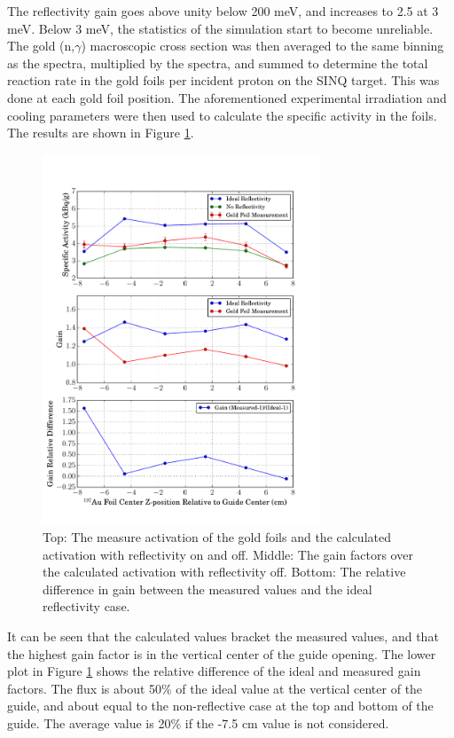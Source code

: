 \documentclass[a4paper,
              ]{jacow}
\begin{document}
The reflectivity gain goes above unity below 200 meV, and increases to 2.5 at 3 meV.  Below 3 meV, the statistics of the simulation start to become unreliable.  The gold (n,$\gamma$) macroscopic cross section was then averaged to the same binning as the spectra, multiplied by the spectra, and summed to determine the total reaction rate in the gold foils per incident proton on the SINQ target.  This was done at each gold foil position.  The aforementioned experimental irradiation and cooling parameters were then used to calculate the specific activity in the foils.  The results are shown in Figure \ref{activation}.

\begin{figure}[!htb]
   \centering
   \includegraphics*[trim = 0mm 5mm 15mm 25mm, width=83mm]{graphics/GF_act.pdf}
   \caption{Top: The measure activation of the gold foils and the calculated activation with reflectivity on and off.  Middle:  The gain factors over the calculated activation with reflectivity off.  Bottom:  The relative difference in gain between the measured values and the ideal reflectivity case.}
   \label{activation}
\end{figure}

It can be seen that the calculated values bracket the measured values, and that the highest gain factor is in the vertical center of the guide opening.  The lower plot in Figure \ref{activation} shows the relative difference of the ideal and measured gain factors.  The flux is about 50\% of the ideal value at the vertical center of the guide, and about equal to the non-reflective case at the top and bottom of the guide.  The average value is 20\% if the -7.5 cm value is not considered.
\end{document}
